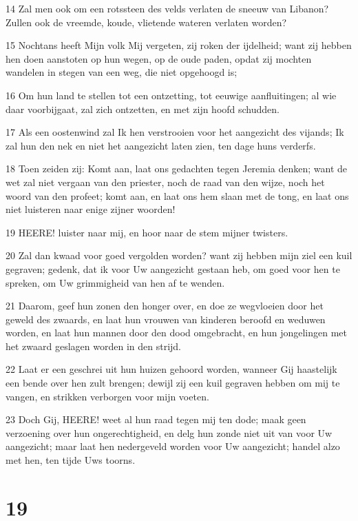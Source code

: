 \par 14 Zal men ook om een rotssteen des velds verlaten de sneeuw van Libanon? Zullen ook de vreemde, koude, vlietende wateren verlaten worden?
\par 15 Nochtans heeft Mijn volk Mij vergeten, zij roken der ijdelheid; want zij hebben hen doen aanstoten op hun wegen, op de oude paden, opdat zij mochten wandelen in stegen van een weg, die niet opgehoogd is;
\par 16 Om hun land te stellen tot een ontzetting, tot eeuwige aanfluitingen; al wie daar voorbijgaat, zal zich ontzetten, en met zijn hoofd schudden.
\par 17 Als een oostenwind zal Ik hen verstrooien voor het aangezicht des vijands; Ik zal hun den nek en niet het aangezicht laten zien, ten dage huns verderfs.
\par 18 Toen zeiden zij: Komt aan, laat ons gedachten tegen Jeremia denken; want de wet zal niet vergaan van den priester, noch de raad van den wijze, noch het woord van den profeet; komt aan, en laat ons hem slaan met de tong, en laat ons niet luisteren naar enige zijner woorden!
\par 19 HEERE! luister naar mij, en hoor naar de stem mijner twisters.
\par 20 Zal dan kwaad voor goed vergolden worden? want zij hebben mijn ziel een kuil gegraven; gedenk, dat ik voor Uw aangezicht gestaan heb, om goed voor hen te spreken, om Uw grimmigheid van hen af te wenden.
\par 21 Daarom, geef hun zonen den honger over, en doe ze wegvloeien door het geweld des zwaards, en laat hun vrouwen van kinderen beroofd en weduwen worden, en laat hun mannen door den dood omgebracht, en hun jongelingen met het zwaard geslagen worden in den strijd.
\par 22 Laat er een geschrei uit hun huizen gehoord worden, wanneer Gij haastelijk een bende over hen zult brengen; dewijl zij een kuil gegraven hebben om mij te vangen, en strikken verborgen voor mijn voeten.
\par 23 Doch Gij, HEERE! weet al hun raad tegen mij ten dode; maak geen verzoening over hun ongerechtigheid, en delg hun zonde niet uit van voor Uw aangezicht; maar laat hen nedergeveld worden voor Uw aangezicht; handel alzo met hen, ten tijde Uws toorns.

\chapter{19}

